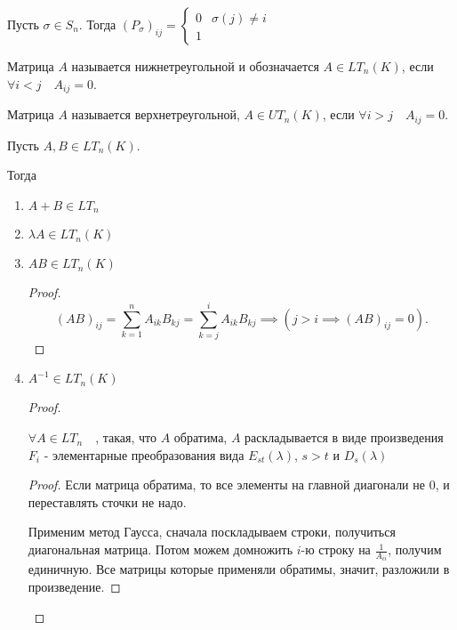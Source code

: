 \begin{definition} \thmslashn 

    Пусть $\sigma\in S_{n}$. Тогда $(P_{\sigma})_{ij} = \begin{cases}
        0 & \sigma(j) \neq i\\
        1 
    \end{cases}$
\end{definition}
\begin{definition} \thmslashn 

    Матрица $A$ называется нижнетреугольной и обозначается $A\in LT_{n}(K)$, если $\forall{i < j}\quad A_{ij} = 0$.

    Матрица $A$ называется верхнетреугольной, $A\in UT_{n}(K)$, если $\forall{i > j}\quad A_{ij} = 0$.
\end{definition}
\begin{statement} \thmslashn

    Пусть $A,B\in LT_{n}(K)$.

    Тогда
    \begin{enumerate}
        \item $A + B\in LT_{n}$
        \item $\lambda A\in LT_{n}(K)$ 
        \item $AB\in LT_{n}(K)$ 
            \begin{proof} \thmslashn
            
                \[ (AB)_{ij} = \sum\limits_{k=1}^{n} A_{ik}B_{kj} = \sum\limits_{k=j}^{i} A_{ik}B_{kj} \implies (j > i \implies (AB)_{ij} = 0) .\] 
            \end{proof}
        \item $A^{-1}\in LT_{n}(K)$
            \begin{proof} \thmslashn
            
               \begin{lemma} \thmslashn
               
                   $\forall{A\in LT_{n}}\quad $, такая, что $A$ обратима, $A$ раскладывается в виде произведения $F_{i}$ - элементарные преобразования вида $E_{st}(\lambda)$, $s>t$ и $D_{s}(\lambda)$
                   \begin{proof} \thmslashn
                   
                       Если матрица обратима, то все элементы на главной диагонали не $0$, и переставлять сточки не надо.

                       Применим метод Гаусса, сначала поскладываем строки, получиться диагональная матрица. Потом можем домножить $i$-ю строку на $\frac{1}{A_{ii}}$, получим единичную. Все матрицы которые применяли обратимы, значит, разложили в произведение.
                   \end{proof}
               \end{lemma}


\end{proof}
\end{enumerate}
\end{statement}
